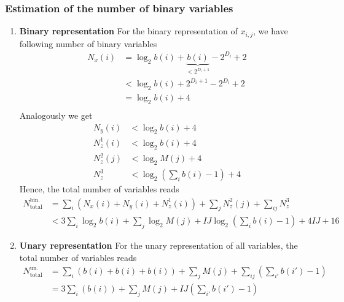 \documentclass{article}
\begin{document}
\subsubsection{Estimation of the number of binary variables}
\begin{enumerate}
    \item \textbf{Binary representation}
    For the binary representation of $x_{i, j}$, we have following number of binary variables
    \begin{align*}
        N_x(i) & = \log_2 b(i) + \underbrace{b(i)}_{< 2^{D_i + 1}} - 2^{D_i} + 2 \\
               & < \log_2 b(i) + 2^{D_i + 1} - 2^{D_i} + 2 \\
               & = \log_2 b(i) + 4 \\
    \end{align*}
    Analogously we get 
    \begin{align*}
        N_y(i) &< \log_2 b(i) + 4 \\
        N_{z}^1(i) &< \log_2 b(i) + 4 \\
        N_{z}^2(j) &< \log_2 M(j) + 4 \\
        N_{z}^3 &< \log_2\left(\sum_i b(i) - 1\right) + 4 
    \end{align*}
    Hence, the total number of variables reads
    \begin{align*}
        N_\text{total}^\text{bin. rep.} & = \sum_i \left( N_x(i) + N_y(i) + N_{z}^1(i) \right) + \sum_j N_{z}^2(j) + \sum_{ij} N_{z}^3 \\
                                        & < 3 \sum_i \log_2 b(i) + \sum_j \log_2 M(j) + I J \log_2 \left( \sum_i b(i) - 1 \right) + 4 I J  + 16 
    \end{align*}
    \item \textbf{Unary representation}
    For the unary representation of all variables, the total number of variables reads
    \begin{align*}
        N_\text{total}^\text{un. rep.} & = \sum_i \left( b(i) + b(i) + b(i)\right) + \sum_j M(j) + \sum_{ij} \left(\sum_{i'} b(i') - 1\right) \\
                                       & = 3 \sum_i \left(b(i)\right) + \sum_j M(j) + I J \left(\sum_{i'} b(i') - 1\right)
    \end{align*}
\end{enumerate}
\end{document}
